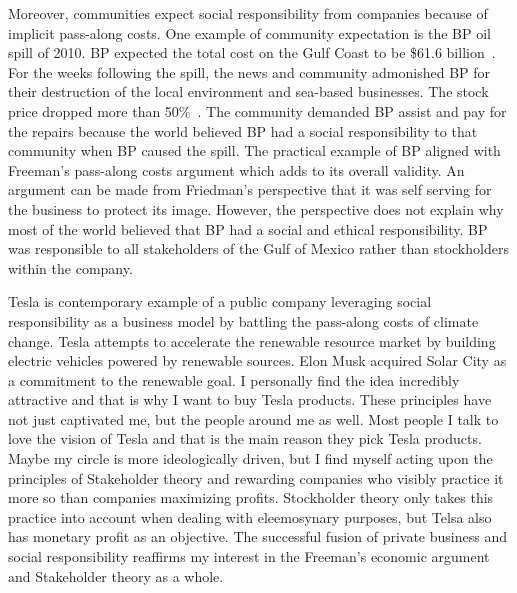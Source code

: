 \documentclass{article}
\begin{document}
Moreover, communities expect social responsibility from companies because of
implicit pass-along costs. One example of community expectation is the BP oil
spill of 2010. BP expected the total cost on the Gulf Coast to be \$61.6
billion~\cite{bp_spill}. For the weeks following the spill, the news and
community admonished BP for their destruction of the local environment and
sea-based businesses. The stock price dropped more than 50\%~\cite{stock}. The
community demanded BP assist and pay for the repairs because the world believed
BP had a social responsibility to that community when BP caused the spill. The
practical example of BP aligned with Freeman's pass-along costs argument which
adds to its overall validity. An argument can be made from Friedman's
perspective that it was self serving for the business to protect its image.
However, the perspective does not explain why most of the world believed that BP
had a social and ethical responsibility. BP was responsible to all stakeholders
of the Gulf of Mexico rather than stockholders within the company.

Tesla is contemporary example of a public company leveraging social
responsibility as a business model by battling the pass-along costs of climate
change. Tesla attempts to accelerate the renewable resource market by building
electric vehicles powered by renewable sources. Elon Musk acquired Solar City as
a commitment to the renewable goal. I personally find the idea incredibly
attractive and that is why I want to buy Tesla products. These principles have
not just captivated me, but the people around me as well. Most people I talk to
love the vision of Tesla and that is the main reason they pick Tesla products.
Maybe my circle is more ideologically driven, but I find myself acting upon the
principles of Stakeholder theory and rewarding companies who visibly practice it
more so than companies maximizing profits.  Stockholder theory only takes this
practice into account when dealing with eleemosynary purposes, but Telsa also
has monetary profit as an objective. The successful fusion of private business
and social responsibility reaffirms my interest in the Freeman's economic
argument and Stakeholder theory as a whole.




\end{document}
